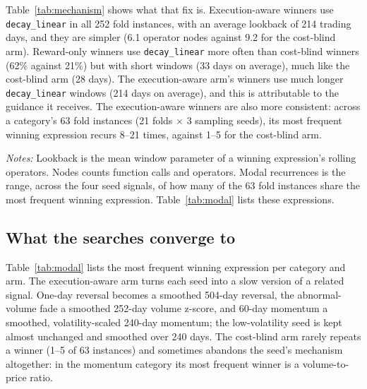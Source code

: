 \documentclass[preprint,12pt,authoryear]{elsarticle}
\newcommand{\tablenote}[1]{\par\vspace{0.4em}\begin{minipage}{\linewidth}\footnotesize #1\end{minipage}}
\begin{document}
Table~\ref{tab:mechanism} shows what that fix is. Execution-aware winners use \texttt{decay\_linear} in all 252 fold instances, with an average lookback of 214 trading days, and they are simpler (6.1 operator nodes against 9.2 for the cost-blind arm). Reward-only winners use \texttt{decay\_linear} more often than cost-blind winners (62\% against 21\%) but with short windows (33 days on average), much like the cost-blind arm (28 days). The execution-aware arm's winners use much longer \texttt{decay\_linear} windows (214 days on average), and this is attributable to the guidance it receives. The execution-aware winners are also more consistent: across a category's 63 fold instances (21 folds $\times$ 3 sampling seeds), its most frequent winning expression recurs 8--21 times, against 1--5 for the cost-blind arm.

\begin{table}[t]
\centering
\caption{Structure of the winning factors (252 fold instances per arm).}
\label{tab:mechanism}
\footnotesize
\resizebox{\linewidth}{!}{}
\tablenote{\emph{Notes:} Lookback is the mean window parameter of a winning expression's rolling operators. Nodes counts function calls and operators. Modal recurrences is the range, across the four seed signals, of how many of the 63 fold instances share the most frequent winning expression. Table~\ref{tab:modal} lists these expressions.}
\end{table}

\subsection{What the searches converge to}\label{sec:modal}

Table~\ref{tab:modal} lists the most frequent winning expression per category and arm. The execution-aware arm turns each seed into a slow version of a related signal. One-day reversal becomes a smoothed 504-day reversal, the abnormal-volume fade a smoothed 252-day volume z-score, and 60-day momentum a smoothed, volatility-scaled 240-day momentum; the low-volatility seed is kept almost unchanged and smoothed over 240 days. The cost-blind arm rarely repeats a winner (1--5 of 63 instances) and sometimes abandons the seed's mechanism altogether: in the momentum category its most frequent winner is a volume-to-price ratio.

\begin{table}[t]
\centering
\caption{Most frequent winning expression by seed signal and feedback condition (count out of 63 fold instances).}
\label{tab:modal}
\footnotesize
\resizebox{\linewidth}{!}{}
\end{table}
\end{document}
